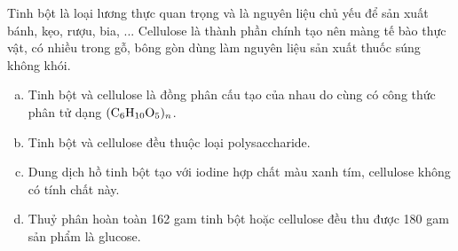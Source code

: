 \documentclass[12pt,a4paper]{article}
\begin{document}
\begin{ex}
Tinh bột là loại lương thực quan trọng và là nguyên liệu chủ yếu để sản xuất bánh, kẹo, rượu, bia, ... Cellulose là thành phần chính tạo nên màng tế bào thực vật, có nhiều trong gỗ, bông gòn dùng làm nguyên liệu sản xuất thuốc súng không khói.
\begin{enumerate}[a)]
	\item Tinh bột và cellulose là đồng phân cấu tạo của nhau do cùng có công thức phân tử dạng $\ce{(C6H10O5)_n}$.
	\item Tinh bột và cellulose đều thuộc loại polysaccharide.
	\item Dung dịch hồ tinh bột tạo với iodine hợp chất màu xanh tím, cellulose không có tính chất này.
	\item Thuỷ phân hoàn toàn 162 gam tinh bột hoặc cellulose đều thu được 180 gam sản phẩm là glucose.
\end{enumerate}
\end{ex}
\end{document}
